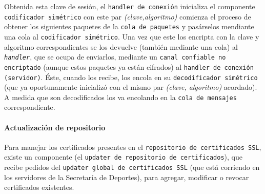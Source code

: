 Obtenida esta clave de sesión, el \texttt{handler de conexión} inicializa el componente \texttt{codificador simétrico} con este par \emph{(clave,algoritmo)} comienza el proceso de obtener los siguientes paquetes de la \texttt{cola de paquetes} y pasárselos mendiante una cola al \texttt{codificador simétrico}. Una vez que este los encripta con la clave y algoritmo correspondientes se los devuelve (también mediante una cola) al \texttt{\emph{handler}}, que se ocupa de enviarlos, mediante un \texttt{canal confiable no encriptado} (aunque estos paquetes ya están cifrados) al \texttt{handler de conexión (servidor)}. Éste, cuando los recibe, los encola en su \texttt{decodificador simétrico} (que ya oportunamente inicializó con el mismo par \emph{(clave, algoritmo)} acordado). A medida que son decodificados los va encolando en la \texttt{cola de mensajes} correspondiente.

\paragraph{Actualización de repositorio}
Para manejar los certificados presentes en el \texttt{repositorio de certificados SSL}, existe un componente (el \texttt{updater de repositorio de certificados}), que recibe pedidos del \texttt{updater global de certificados SSL} (que está corriendo en los servidores de la Secretaría de Deportes), para agregar, modificar o revocar certificados existentes. 
